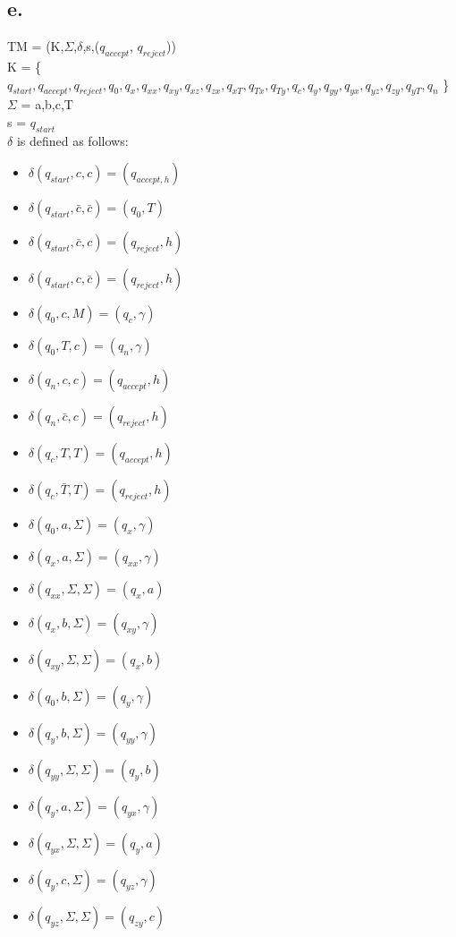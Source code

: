 \documentclass[12pt]{article}
\begin{document}
\subsection*{e.}
TM = (K,$\Sigma$,$\delta$,s,($q_{accept}$, $q_{reject}$)) \\
K = \{$q_{start},q_{accept}, q_{reject}, q_0,q_x,q_{xx},q_{xy},q_{xz},q_{zx},q_{xT},q_{Tx},q_{Ty},q_c,q_y,q_{yy},q_{yx},q_{yz},q_{zy},q_{yT},q_n$    \} \\
$\Sigma$ = a,b,c,T \\
s = $q_{start}$ \\
$\delta$ is defined as follows: \\
\begin{itemize}
	\item $\delta(q_{start},c,c) = (q_{accept,h})$
	\item $\delta(q_{start},\bar{c},\bar{c}) = (q_0,T)$
	\item $\delta(q_{start},\bar{c},c) = (q_{reject},h)$
	\item $\delta(q_{start},c,\bar{c}) = (q_{reject},h)$
	\item $\delta(q_0,c,M) = (q_c,\gamma)$
	\item $\delta(q_0,T,c) = (q_n,\gamma)$
	\item $\delta(q_n,c,c) = (q_{accept},h)$
	\item $\delta(q_n,\bar{c},c) = (q_{reject},h)$
	\item $\delta(q_c,T,T) = (q_{accept},h)$
	\item $\delta(q_c,\bar{T},T) = (q_{reject},h)$
	\item $\delta(q_0,a,\Sigma) = (q_x,\gamma)$
	\item $\delta(q_x,a,\Sigma) = (q_{xx}, \gamma)$
	\item $\delta(q_{xx},\Sigma,\Sigma) = (q_x,a)$
	\item $\delta(q_x,b,\Sigma) = (q_{xy},\gamma)$
	\item $\delta(q_{xy},\Sigma,\Sigma) = (q_x,b)$
	\item $\delta(q_0,b,\Sigma)=(q_y,\gamma)$
	\item $\delta(q_y,b,\Sigma) = (q_{yy},\gamma)$
	\item $\delta(q_{yy},\Sigma,\Sigma)=(q_y,b)$
	\item $\delta(q_y,a,\Sigma) = (q_{yx},\gamma)$
	\item $\delta(q_{yx},\Sigma,\Sigma)=(q_y,a)$
	\item $\delta(q_y,c,\Sigma)=(q_{yz},\gamma)$
	\item $\delta(q_{yz},\Sigma,\Sigma) = (q_{zy},c)$

\end{itemize}
\end{document}
